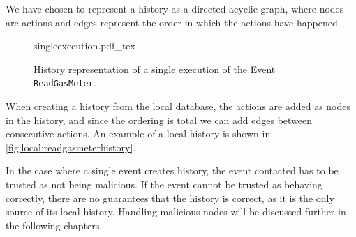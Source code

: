 	\newpar
	We have chosen to represent a history as a directed acyclic graph, where nodes are actions and edges represent the order in which the actions have happened.
	
	\begin{figure}
		\centering
		{singleexecution.pdf_tex}
		\caption{History representation of a single execution of the Event \texttt{ReadGasMeter}.}
		\label{fig:local:readgasmeterhistory}
	\end{figure}
	\newpar When creating a history from the local database, the actions are added as nodes in the history, and since the ordering is total we can add edges between consecutive actions. An example of a local history is shown in \autoref{fig:local:readgasmeterhistory}.
	
	
%	
%	
%	
%	
	\newpar In the case where a single event creates history, the event contacted has to be trusted as not being malicious. If the event cannot be trusted as behaving correctly, there are no guarantees that the history is correct, as it is the only source of its local history. Handling malicious nodes will be discussed further in the following chapters.
